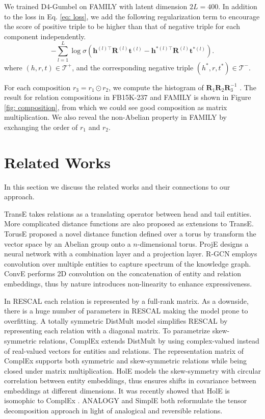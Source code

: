 \documentclass[11pt,a4paper]{article}
\begin{document}
We trained D4-Gumbel on FAMILY with latent dimension $2L=400$. In addition to the loss in Eq. \ref{eq: loss}, we add the following regularization term to encourage the score of positive triple to be higher than that of negative triple for each component independently.
\begin{equation*}
-\sum_{l=1}^{L} \log\sigma\left(\bm{h}^{(l)\top}\bm{R}^{(l)}\bm{t}^{(l)} -\bm{h}^{*(l)\top}\bm{R}^{(l)}\bm{t}^{*(l)}\right).
\end{equation*}
where $(h,r,t)\in \mathcal{T}^{+}$,  and the corresponding negative triple $(h^*,r,t^*)\in \mathcal{T}^{-}$.


For each composition $r_3=r_1\odot r_2$, we compute the histogram of  $\bm{R}_1\bm{R}_2\bm{R}_3^{-1}$ . The result for relation compositions in FB15K-237 and FAMILY is shown in Figure \ref{fig: composition}, from which we could see good composition as matrix multiplication. We also reveal the non-Abelian property in FAMILY by exchanging the order of $r_1$ and $r_2$. \section{Related Works}


In this section we discuss the related works and their connections to our approach.

TransE \cite{transe} takes relations as a translating operator between head and tail entities. More complicated distance functions \cite{transh, transr, ptranse} are also proposed as extensions to TransE. TorusE \cite{torusE} proposed a novel distance function defined over a torus by transform the vector space by an Abelian group onto a $n$-dimensional torus. ProjE \cite{proje} designs a neural network with a combination layer and a projection layer. R-GCN \cite{rgcn} employs convolution  over multiple entities to capture spectrum of the knowledge graph. ConvE \cite{convE} performs 2D convolution on the concatenation of entity and relation embeddings, thus by nature introduces non-linearity to enhance expressiveness. 

In RESCAL \cite{rescal} each relation is represented by a full-rank matrix. As a downside, there is a huge number of parameters in RESCAL making the model prone to overfitting.  A totally symmetric DistMult \cite{distmult} model simplifies RESCAL by representing each relation with a diagonal matrix. To parametrize skew-symmetric relations, ComplEx \cite{complex} extends DistMult by using complex-valued instead of real-valued vectors for entities and relations. The representation matrix of ComplEx supports both symmetric and skew-symmetric relations while being closed under matrix multiplication. HolE \cite{hole} models the skew-symmetry with circular correlation between entity embeddings, thus ensures shifts in covariance  between embeddings at different dimensions. It was recently showed that HolE is isomophic to ComplEx \cite{isomophic}. ANALOGY \cite{analogy} and SimplE \cite{simple} both reformulate the tensor decomposition approach in light of analogical and reversible relations.
\end{document}
